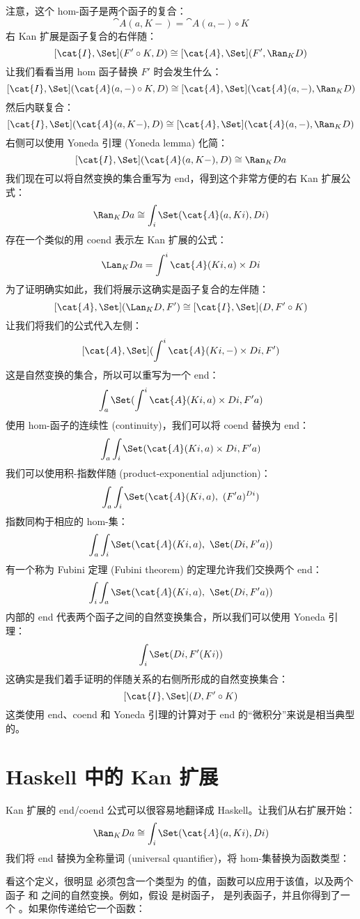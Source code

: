 \noindent
注意，这个 hom-函子是两个函子的复合：
\[\cat{A}(a, K -) = \cat{A}(a, -) \circ K\]
右 Kan 扩展是函子复合的右伴随：
\[[\cat{I}, \Set](F' \circ K, D) \cong [\cat{A}, \Set](F', \Ran_{K}D)\]
让我们看看当用 hom 函子替换 $F'$ 时会发生什么：
\[[\cat{I}, \Set](\cat{A}(a, -) \circ K, D) \cong [\cat{A}, \Set](\cat{A}(a, -), \Ran_{K}D)\]
然后内联复合：
\[[\cat{I}, \Set](\cat{A}(a, K -), D) \cong [\cat{A}, \Set](\cat{A}(a, -), \Ran_{K}D)\]
右侧可以使用 Yoneda 引理 (Yoneda lemma) 化简：
\[[\cat{I}, \Set](\cat{A}(a, K -), D) \cong \Ran_{K}D a\]
我们现在可以将自然变换的集合重写为 end，得到这个非常方便的右 Kan 扩展公式：
\[\Ran_{K}D a \cong \int_i \Set(\cat{A}(a, K i), D i)\]
存在一个类似的用 coend 表示左 Kan 扩展的公式：
\[\Lan_{K}D a = \int^i \cat{A}(K i, a)\times{}D i\]
为了证明确实如此，我们将展示这确实是函子复合的左伴随：
\[[\cat{A}, \Set](\Lan_{K}D, F') \cong [\cat{I}, \Set](D, F' \circ K)\]
让我们将我们的公式代入左侧：
\[[\cat{A}, \Set](\int^i \cat{A}(K i, -)\times{}D i, F')\]
这是自然变换的集合，所以可以重写为一个 end：
\[\int_a \Set(\int^i \cat{A}(K i, a)\times{}D i, F' a)\]
使用 hom-函子的连续性 (continuity)，我们可以将 coend 替换为 end：
\[\int_a \int_i \Set(\cat{A}(K i, a)\times{}D i, F' a)\]
我们可以使用积-指数伴随 (product-exponential adjunction)：
\[\int_a \int_i \Set(\cat{A}(K i, a),\ (F' a)^{D i})\]
指数同构于相应的 hom-集：
\[\int_a \int_i \Set(\cat{A}(K i, a),\ \Set(D i, F' a))\]
有一个称为 Fubini 定理 (Fubini theorem) 的定理允许我们交换两个 end：
\[\int_i \int_a \Set(\cat{A}(K i, a),\ \Set(D i, F' a))\]
内部的 end 代表两个函子之间的自然变换集合，所以我们可以使用 Yoneda 引理：
\[\int_i \Set(D i, F' (K i))\]
这确实是我们着手证明的伴随关系的右侧所形成的自然变换集合：
\[[\cat{I}, \Set](D, F' \circ K)\]
这类使用 end、coend 和 Yoneda 引理的计算对于 end 的“微积分”来说是相当典型的。

\section{Haskell 中的 Kan 扩展}

Kan 扩展的 end/coend 公式可以很容易地翻译成 Haskell。让我们从右扩展开始：
\[\Ran_{K}D a \cong \int_i \Set(\cat{A}(a, K i), D i)\]
我们将 end 替换为全称量词 (universal quantifier)，将 hom-集替换为函数类型：

看这个定义，很明显  必须包含一个类型为  的值，函数可以应用于该值，以及两个函子  和  之间的自然变换。例如，假设  是树函子， 是列表函子，并且你得到了一个 。如果你传递给它一个函数：

